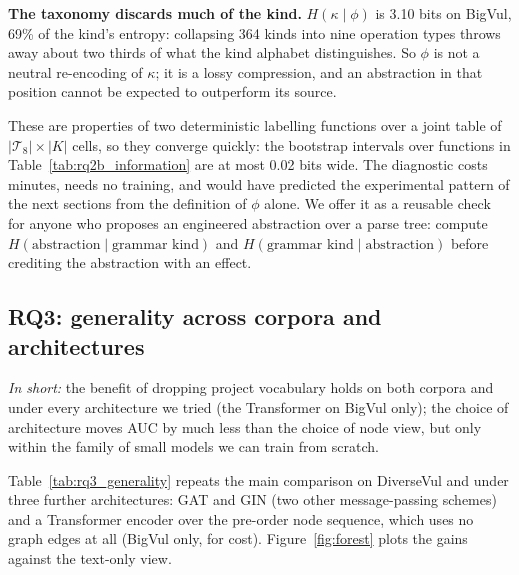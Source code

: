 \documentclass[pdflatex,sn-basic]{sn-jnl}
\theoremstyle{thmstyleone}%
\newcommand{\numbigvulHKindGivenPhi}{3.10}
\newcommand{\numbigvulKindLost}{69}
\newcommand{\numkindGivenPhiCiWidthMax}{0.02}
\begin{document}
\textbf{The taxonomy discards much of the kind.} $H(\kappa \mid \phi)$ is
\numbigvulHKindGivenPhi{} bits on BigVul, \numbigvulKindLost\% of the kind's
entropy: collapsing 364 kinds into nine operation types throws away about two
thirds of what the kind alphabet distinguishes. So $\phi$ is not a neutral
re-encoding of $\kappa$; it is a lossy compression, and an abstraction in that
position cannot be expected to outperform its source.

These are properties of two deterministic labelling functions over a joint
table of $|\mathcal{T}_8| \times |K|$ cells, so they converge quickly: the
bootstrap intervals over functions in Table~\ref{tab:rq2b_information} are
at most \numkindGivenPhiCiWidthMax{} bits wide. The diagnostic costs minutes, needs no training, and
would have predicted the experimental pattern of the next sections from the
definition of $\phi$ alone. We offer it as a reusable check for anyone who
proposes an engineered abstraction over a parse tree: compute
$H(\text{abstraction} \mid \text{grammar kind})$ and $H(\text{grammar kind}
\mid \text{abstraction})$ before crediting the abstraction with an effect.


\subsection{RQ3: generality across corpora and architectures}
\label{sec:rq_generality}

\emph{In short:} the benefit of dropping project vocabulary holds on both
corpora and under every architecture we tried (the Transformer on BigVul
only); the choice of architecture
moves AUC by much less than the choice of node view, but only within the
family of small models we can train from scratch.

Table~\ref{tab:rq3_generality} repeats the main comparison on DiverseVul and
under three further architectures: GAT and GIN (two other message-passing
schemes) and a Transformer encoder over the pre-order node sequence, which uses
no graph edges at all (BigVul only, for cost). Figure~\ref{fig:forest} plots
the gains against the text-only view.
\end{document}
